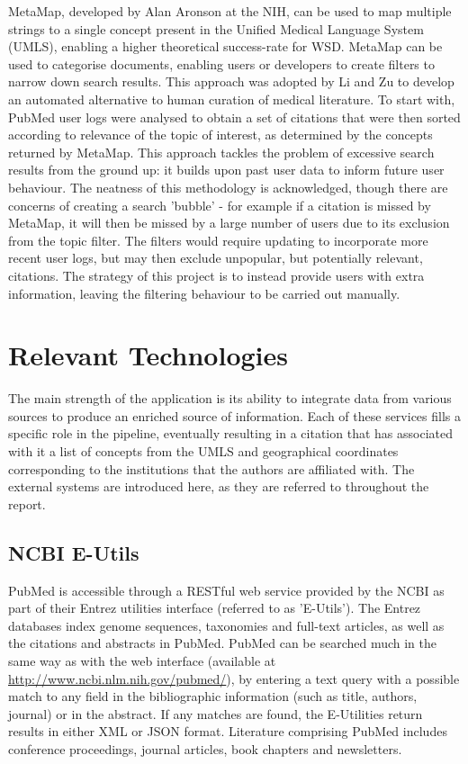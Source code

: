 \documentclass[Report.tex]{subfiles}
\begin{document}
\noindent MetaMap, developed by Alan Aronson at the NIH, can be used to map multiple strings to a single concept present in the Unified Medical Language System (UMLS), enabling a higher theoretical success-rate for WSD. MetaMap can be used to categorise documents, enabling users or developers to create filters to narrow down search results. This approach was adopted by Li and Zu\cite{lizu} to develop an automated alternative to human curation of medical literature. To start with, PubMed user logs were analysed to obtain a set of citations that were then sorted according to relevance of the topic of interest, as determined by the concepts returned by MetaMap. This approach tackles the problem of excessive search results from the ground up: it builds upon past user data to inform future user behaviour. The neatness of this methodology is acknowledged, though there are concerns of creating a search 'bubble' - for example if a citation is missed by MetaMap, it will then be missed by a large number of users due to its exclusion from the topic filter. The filters would require updating to incorporate more recent user logs, but may then exclude unpopular, but potentially relevant, citations. The strategy of this project is to instead provide users with extra information, leaving the filtering behaviour to be carried out manually. 

\section{Relevant Technologies}
The main strength of the application is its ability to integrate data from various sources to produce an enriched source of information. Each of these services fills a specific role in the pipeline, eventually resulting in a citation that has associated with it a list of concepts from the UMLS and geographical coordinates corresponding to the institutions that the authors are affiliated with. The external systems are introduced here, as they are referred to throughout the report.

\subsection{NCBI E-Utils}
PubMed is accessible through a RESTful web service provided by the NCBI as part of their Entrez utilities interface (referred to as 'E-Utils')\cite{eutils}. The Entrez databases index genome sequences, taxonomies and full-text articles, as well as the citations and abstracts in PubMed. PubMed can be searched much in the same way as with the web interface (available at \url{http://www.ncbi.nlm.nih.gov/pubmed/}), by entering a text query with a possible match to any field in the bibliographic information (such as title, authors, journal) or in the abstract. If any matches are found, the E-Utilities return results in either XML or JSON format. Literature comprising PubMed includes conference proceedings, journal articles, book chapters and newsletters.
\end{document}
